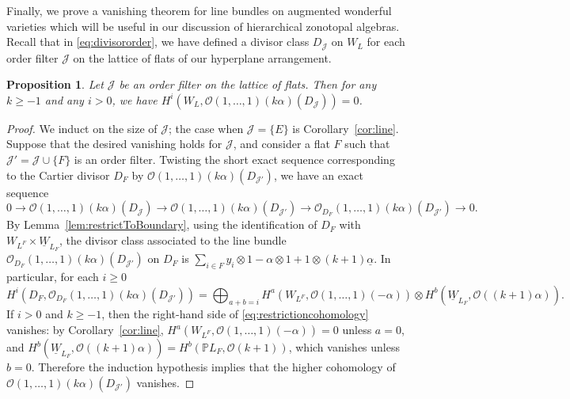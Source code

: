 \documentclass{amsart}
\newtheorem{proposition}[theorem]{Proposition}
\theoremstyle{definition}
\begin{document}
Finally, we prove a vanishing theorem for line bundles on augmented wonderful varieties which will be useful in our discussion of hierarchical zonotopal algebras. Recall that in \eqref{eq:divisororder}, we have defined a divisor class $D_{\mathcal{J}}$ on $W_L$ for each order filter $\mathcal{J}$ on the lattice of flats of our hyperplane arrangement. 

\begin{proposition}\label{prop:hierarchicalvanishing}
Let $\mathcal{J}$ be an order filter on the lattice of flats. Then for any $k \ge -1$ and any $i > 0$, we have $H^i(W_L, \mathcal{O}(1, \dotsc, 1)(k \alpha)(D_{\mathcal{J}})) = 0$. 
\end{proposition}

\begin{proof}
We induct on the size of $\mathcal{J}$; the case when $\mathcal{J} = 
\{E\}$ is Corollary~\ref{cor:line}. Suppose that the desired vanishing 
holds for $\mathcal{J}$, and consider a flat $F$ such that $\mathcal{J}' 
= \mathcal{J} \cup \{F\}$ is an order filter. Twisting the short exact 
sequence corresponding to the Cartier divisor $D_F$ by $\mathcal{O}(1, 
\dotsc, 1)(k \alpha)(D_{\mathcal{J}'})$, we have an exact sequence
$$0 \to \mathcal{O}(1, \dotsc, 1)(k \alpha)(D_{\mathcal{J}}) \to \mathcal{O}(1, \dotsc, 1)(k \alpha)(D_{\mathcal{J}'}) \to \mathcal{O}_{D_F}(1, \dotsc, 1)(k \alpha)(D_{\mathcal{J}'}) \to 0.$$
By Lemma~\ref{lem:restrictToBoundary}, using the identification of $D_F$ with $W_{L^F} \times \underline{W}_{L_F}$, the divisor class associated to the line bundle $\mathcal{O}_{D_F}(1, \dotsc, 1)(k \alpha)(D_{\mathcal{J}'})$ on $D_F$ is $\sum_{i \in F} y_i \otimes 1 - \alpha \otimes 1 + 1 \otimes (k+1) \underline{\alpha}$. In particular, for each $i \ge 0$
\begin{equation}\label{eq:restrictioncohomology}
H^i(D_F, \mathcal{O}_{D_F}(1, \dotsc, 1)(k \alpha)(D_{\mathcal{J}'})) = \bigoplus_{a + b = i} H^{a}(W_{L^F}, \mathcal{O}(1, \dotsc, 1)(-\alpha)) \otimes H^b(\underline{W}_{L_F}, \mathcal{O}((k+1)\alpha)).
\end{equation}
If $i > 0$ and $k \ge -1$, then the right-hand side of \eqref{eq:restrictioncohomology} vanishes: by Corollary~\ref{cor:line}, $H^{a}(W_{L^F}, \mathcal{O}(1, \dotsc, 1)(-\alpha)) = 0$ unless $a = 0$, and $H^b(\underline{W}_{L_F}, \mathcal{O}((k+1)\alpha)) = H^b(\mathbb{P}L_F, \mathcal{O}(k+1))$, which vanishes unless $b = 0$. Therefore the induction hypothesis implies that the higher cohomology of $\mathcal{O}(1, \dotsc, 1)(k \alpha)(D_{\mathcal{J}'})$ vanishes. 
\end{proof}
\end{document}
